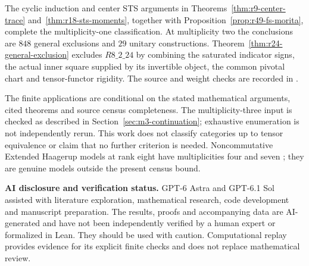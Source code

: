 \documentclass[11pt,reqno]{amsart}
\theoremstyle{definition}
\theoremstyle{remark}
\begin{document}
The cyclic induction and center STS arguments in
Theorems~\ref{thm:r9-center-trace} and~\ref{thm:r18-sts-moments}, together
with Proposition~\ref{prop:r49-fs-morita}, complete the multiplicity-one
classification. At multiplicity two the conclusions are $848$ general
exclusions and $29$ unitary constructions.
Theorem~\ref{thm:r24-general-exclusion} excludes $R8\_2\_24$ by combining
the saturated indicator signs, the actual inner square supplied by its
invertible object, the common pivotal chart and tensor-functor rigidity.
The source and weight checks are recorded in
.

The finite applications are conditional on the stated mathematical
arguments, cited theorems and source census completeness. The multiplicity-three input is checked as described in Section~\ref{sec:m3-continuation}; exhaustive enumeration is not independently rerun. This work does not classify categories up to tensor equivalence or claim that no further criterion is needed. Noncommutative Extended Haagerup models at rank
eight have multiplicities four and seven \cite{EH}; they are genuine
models outside the present census bound.

\par\medskip\noindent\textbf{AI disclosure and verification status.}
GPT-6 Astra and GPT-6.1 Sol assisted with literature exploration,
mathematical research, code development and manuscript preparation.
The results, proofs and accompanying data are AI-generated and have not
been independently verified by a human expert or formalized in Lean.
They should be used with caution. Computational replay provides evidence
for its explicit finite checks and does not replace mathematical review.
\end{document}
